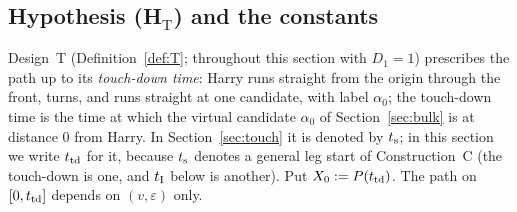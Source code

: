 \subsection{Hypothesis \texorpdfstring{(H$_{\mathrm T}$)}{(HT)} and the constants}

Design~T (Definition~\ref{def:T}; throughout this section with $D_1=1$) prescribes the path up to its \emph{touch-down time}:
Harry runs straight from the origin through the front, turns, and runs straight at one candidate, with label $\alpha_0$; the
touch-down time is the time at which the virtual candidate $\alpha_0$ of Section~\ref{sec:bulk} is at distance $0$ from Harry.
In Section~\ref{sec:touch} it is denoted by $t_{\mathrm s}$; in this section we write $t_{\mathrm{td}}$ for it, because $t_{\mathrm s}$ denotes a general
leg start of Construction~C (the touch-down is one, and $t_{\mathrm I}$ below is another). Put $X_0:=P(t_{\mathrm{td}})$. The path on $[0,t_{\mathrm{td}}]$
depends on $(v,\varepsilon)$ only.

